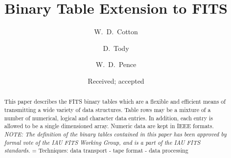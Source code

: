 \newcommand{\Fkw}[1]{{\sf #1}}
\newcommand{\Fkwn}[2]{{\sf #1}{\it #2\/}}
\newcommand{\Fit}[1]{{\it #1\/}}
\newcommand{\Ffi}[2]{{\verb|#1|{\it #2\/}}}
\newcommand{\Ffisi}[4]{{\verb|#1|{\it #2\/}\verb|#3|{\it #4\/}}}
\newcommand{\Frt}[2]{{{\it #1\/}\verb|#2|}}
%

%
  \title{ Binary Table Extension to FITS } 

  \author{ W.~D.~Cotton
	\and  D.~Tody
	\and  W.~D.~Pence}


%
  \date{Received; accepted}           %
%
\maketitle
%
%
\begin{abstract}
This paper describes the FITS binary tables which are a flexible and
efficient means of transmitting a wide variety of data structures.
Table rows may be a mixture of a number of numerical, logical and
character data entries.  In addition, each entry is allowed to be a
single dimensioned array.  Numeric data are kept in IEEE formats.
{\em NOTE: The definition of the binary tables contained in this paper
has been approved by formal vote of the IAU FITS Working Group, and is
a part of the IAU FITS standards.}
%
\keywords= {Techniques: data transport - tape format - data
processing}        %
%
\end{abstract}
%
%
